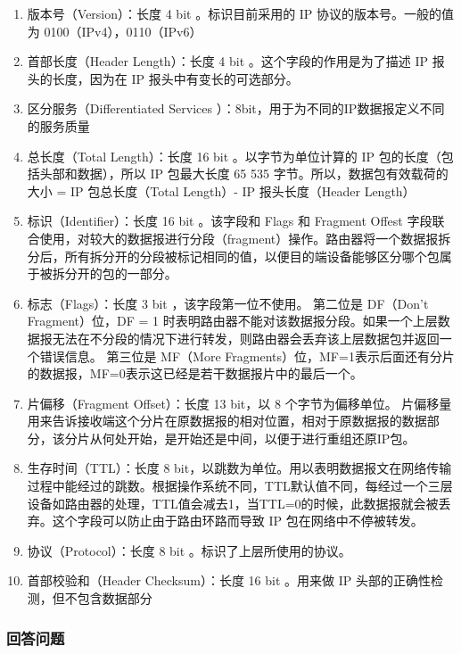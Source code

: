 \documentclass{article}
\begin{document}
\begin{enumerate}[noitemsep]
  \item 版本号（Version）：长度 4 bit 。标识目前采用的 IP 协议的版本号。一般的值为 0100（IPv4），0110（IPv6）
  \item 首部长度（Header Length）：长度 4 bit 。这个字段的作用是为了描述 IP 报头的长度，因为在 IP
        报头中有变长的可选部分。
  \item 区分服务（Differentiated Services ）：8bit，用于为不同的IP数据报定义不同的服务质量
  \item 总长度（Total Length）：长度 16 bit 。以字节为单位计算的 IP 包的长度（包括头部和数据），所以 IP 包最大长度 65
        535 字节。所以，数据包有效载荷的大小 = IP 包总长度（Total Length）- IP 报头长度（Header Length）
  \item 标识（Identifier）：长度 16 bit 。该字段和 Flags 和 Fragment Offest 字段联合使用，对较大的数据报进行分段（fragment）操作。路由器将一个数据报拆分后，所有拆分开的分段被标记相同的值，以便目的端设备能够区分哪个包属于被拆分开的包的一部分。
  \item 标志（Flags）：长度 3 bit ，该字段第一位不使用。
        第二位是 DF（Don’t Fragment）位，DF = 1 时表明路由器不能对该数据报分段。如果一个上层数据报无法在不分段的情况下进行转发，则路由器会丢弃该上层数据包并返回一个错误信息。
        第三位是 MF（More Fragments）位，MF=1表示后面还有分片的数据报，MF=0表示这已经是若干数据报片中的最后一个。
  \item 片偏移（Fragment Offset）：长度 13 bit，以 8 个字节为偏移单位。 片偏移量用来告诉接收端这个分片在原数据报的相对位置，相对于原数据报的数据部分，该分片从何处开始，是开始还是中间，以便于进行重组还原IP包。
  \item 生存时间（TTL）：长度 8 bit，以跳数为单位。用以表明数据报文在网络传输过程中能经过的跳数。根据操作系统不同，TTL默认值不同，每经过一个三层设备如路由器的处理，TTL值会减去1，当TTL=0的时候，此数据报就会被丢弃。这个字段可以防止由于路由环路而导致 IP 包在网络中不停被转发。
  \item 协议（Protocol）：长度 8 bit 。标识了上层所使用的协议。
  \item 首部校验和（Header Checksum）：长度 16 bit 。用来做 IP 头部的正确性检测，但不包含数据部分

\end{enumerate}

\subsubsection{回答问题}
\end{document}

